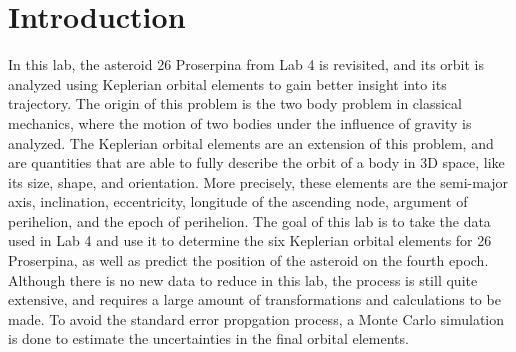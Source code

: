 \documentclass{article}
\begin{document}
\section{Introduction}
In this lab, the asteroid 26 Proserpina from Lab 4 is revisited, and its orbit is analyzed using Keplerian orbital elements to gain better insight into its trajectory. The origin of this problem is the two body problem in classical mechanics, where the motion of two bodies under the influence of gravity is analyzed. The Keplerian orbital elements 
are an extension of this problem, and are quantities that are able to fully describe the orbit of a body in 3D space, like its size, shape, and orientation. More precisely, these elements are the 
semi-major axis, inclination, eccentricity, longitude of the ascending node, argument of perihelion, and the epoch of perihelion. The goal of this lab is to take the data 
used in Lab 4 and use it to determine the six Keplerian orbital elements for 26 Proserpina, as well as predict the position of the asteroid on the fourth epoch. Although there is no new data 
to reduce in this lab, the process is still quite extensive, and requires a large amount of transformations and calculations to be made. To avoid the standard error propgation process, a Monte Carlo 
simulation is done to estimate the uncertainties in the final orbital elements.

\newpage
\end{document}

